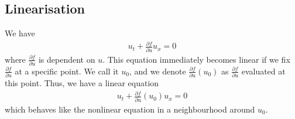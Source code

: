 \subsection{Linearisation}
We have
\begin{align}
	u_t + \frac{\partial f}{\partial u} u_x = 0
\end{align}
where $\frac{\partial f}{\partial u}$ is dependent on $u$. This equation immediately becomes linear if we fix $\frac{\partial f}{\partial u}$ at a specific point. We call it 
$u_0$, and we denote $\frac{\partial f}{\partial u}(u_0)$ as $\frac{\partial f}{\partial u}$ evaluated at this point. Thus, we have a linear equation 
\begin{align*}
u_t + \frac{\partial f}{\partial u}(u_0) u_x = 0
\end{align*}
which behaves like the nonlinear equation in a neighbourhood around $u_0$. 
